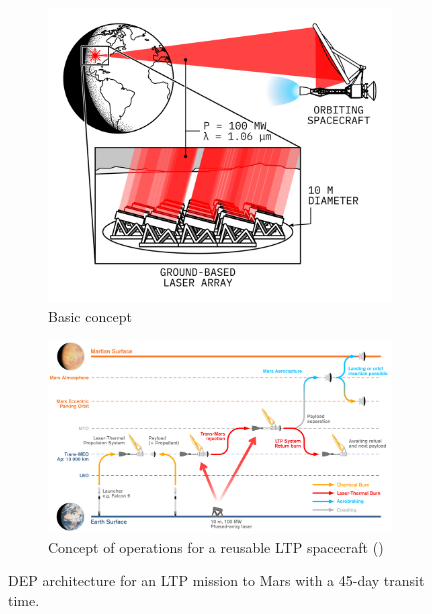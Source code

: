     \begin{figure}[h]
        \centering
        \begin{subfigure}[t]{\textwidth}
            \centering
            \includegraphics[]{assets/2 background/ltp_architecture.png}
            \caption{Basic concept}
            \label{fig:ltp_architecture_basic}
        \end{subfigure}
        \begin{subfigure}[t]{\textwidth}
            \centering
            \includegraphics[width=\textwidth]{assets/1 intro/conops.pdf}
            \caption{Concept of operations for a reusable LTP spacecraft (\textcite{duplayDesignRapidTransit2022})}
            \label{fig:ltp_architecture_conops}
        \end{subfigure}
        \caption{DEP architecture for an LTP mission to Mars with a 45-day transit time.}
        \label{fig:ltp_architecture}
    \end{figure}